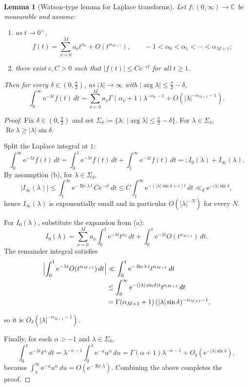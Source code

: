 \documentclass[11pt,letterpaper]{amsart}
\numberwithin{equation}{section}
\newtheorem{lemma}[theorem]{Lemma}
\theoremstyle{definition}
\newcommand{\C}{\mathbb{C}}
\newcommand{\Ree}{\operatorname{Re}}
\newcommand{\e}{\mathrm{e}}
\begin{document}
\begin{lemma}[Watson-type lemma for Laplace transforms]\label{lem:watson}
Let $f:(0,\infty)\to\C$ be measurable and assume:
\begin{enumerate}[label=\textup{(\alph*)},leftmargin=2.5em]
\item as $t\to 0^+$,
\[
f(t)=\sum_{\nu=0}^{M} a_\nu t^{\alpha_\nu}+O(t^{\alpha_{M+1}}),
\qquad -1<\alpha_0<\alpha_1<\cdots<\alpha_{M+1};
\]
\item there exist $c,C>0$ such that $|f(t)|\le C\e^{-c t}$ for all $t\ge 1$.
\end{enumerate}
Then for every $\delta\in(0,\tfrac{\pi}{2})$, as $|\lambda|\to\infty$ with $|\arg\lambda|\le \tfrac{\pi}{2}-\delta$,
\[
\int_0^\infty \e^{-\lambda t}f(t)\,dt
=\sum_{\nu=0}^{M} a_\nu \Gamma(\alpha_\nu+1)\lambda^{-\alpha_\nu-1}
+O(|\lambda|^{-\alpha_{M+1}-1}).
\]
\end{lemma}

\begin{proof}
Fix $\delta\in(0,\tfrac{\pi}{2})$ and set $\Sigma_\delta:=\{\lambda:\ |\arg\lambda|\le \tfrac{\pi}{2}-\delta\}$.
For $\lambda\in\Sigma_\delta$, $\Ree\lambda\ge |\lambda|\sin\delta$.

Split the Laplace integral at $1$:
\[
\int_0^\infty \e^{-\lambda t}f(t)\,dt=\int_0^1 \e^{-\lambda t}f(t)\,dt+\int_1^\infty \e^{-\lambda t}f(t)\,dt=:I_0(\lambda)+I_\infty(\lambda).
\]
By assumption (b), for $\lambda\in\Sigma_\delta$,
\[
|I_\infty(\lambda)|\le \int_1^\infty \e^{-\Ree\lambda\, t}\,C\e^{-ct}\,dt
\le C\int_1^\infty \e^{-(|\lambda|\sin\delta+c)t}\,dt
\ll_\delta \e^{-|\lambda|\sin\delta},
\]
hence $I_\infty(\lambda)$ is exponentially small and in particular $O(|\lambda|^{-N})$ for every $N$.

For $I_0(\lambda)$, substitute the expansion from (a):
\[
I_0(\lambda)=\sum_{\nu=0}^{M} a_\nu \int_0^1 \e^{-\lambda t}t^{\alpha_\nu}\,dt + \int_0^1 \e^{-\lambda t}O(t^{\alpha_{M+1}})\,dt.
\]
The remainder integral satisfies
\begin{align*}
    \Bigl|\int_0^1 \e^{-\lambda t}O(t^{\alpha_{M+1}})\,dt\Bigr|
&\ll \int_0^1 \e^{-\Ree\lambda\, t} t^{\alpha_{M+1}}\,dt\\
&\le \int_0^\infty \e^{-(|\lambda|\sin\delta) t} t^{\alpha_{M+1}}\,dt\\
&=\Gamma(\alpha_{M+1}+1)\,(|\lambda|\sin\delta)^{-\alpha_{M+1}-1},
\end{align*}

so it is $O_\delta(|\lambda|^{-\alpha_{M+1}-1})$.

Finally, for each $\alpha>-1$ and $\lambda\in\Sigma_\delta$,
\[
\int_0^1 \e^{-\lambda t}t^{\alpha}\,dt
=\lambda^{-\alpha-1}\int_0^{\lambda} \e^{-u}u^{\alpha}\,du
=\Gamma(\alpha+1)\lambda^{-\alpha-1}+O_\delta(\e^{-|\lambda|\sin\delta}),
\]
because $\int_\lambda^\infty \e^{-u}u^{\alpha}\,du=O(\e^{-\Ree\lambda})$.
Combining the above completes the proof.
\end{proof}
\end{document}
